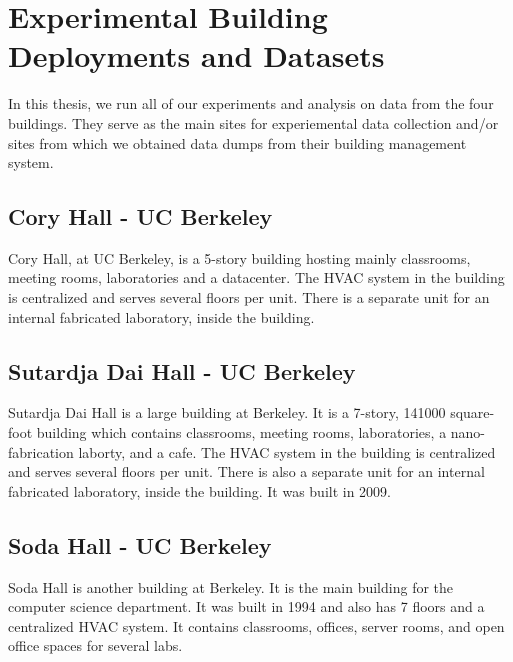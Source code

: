 \section{Experimental Building Deployments and Datasets}

In this thesis, we run all of our experiments and analysis on data from the four buildings.  They serve as 
the main sites for experiemental data collection and/or sites from which we obtained data dumps from their building
management system.



\subsection{Cory Hall - UC Berkeley}
Cory Hall, at UC Berkeley, is a 5-story building hosting mainly classrooms, meeting rooms, laboratories and a datacenter.
The HVAC system in the building is centralized and serves several floors per unit.
There is a separate unit for an internal fabricated laboratory, inside the building.

\subsection{Sutardja Dai Hall - UC Berkeley}
Sutardja Dai Hall is a large building at Berkeley.  It is a 7-story, 141000 square-foot 
 building which contains classrooms, meeting rooms, laboratories, a nano-fabrication laborty, and a cafe.
The HVAC system in the building is centralized and serves several floors per unit.
There is also a separate unit for an internal fabricated laboratory, inside the building.  It was built in 2009.

\subsection{Soda Hall - UC Berkeley}
Soda Hall is another building at Berkeley.  It is the main building for the computer science department.
It was built in 1994 and also has 7 floors and a centralized HVAC system.  It contains classrooms, 
offices, server rooms, and open office spaces for several labs.



